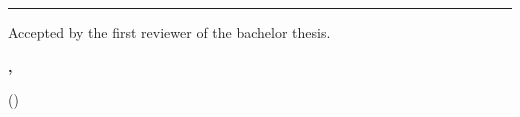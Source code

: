 \vspace*{\fill}

\rule{1.0\textwidth}{0.6pt}

\vspace*{0.75em}

Accepted by the first reviewer of the bachelor thesis.

\textbf{\myplace, \submissiontime}

\vspace*{4em}

\dotfill \hspace*{8cm} 

\hspace*{0.82cm}(\textbf{\reviewerone})
